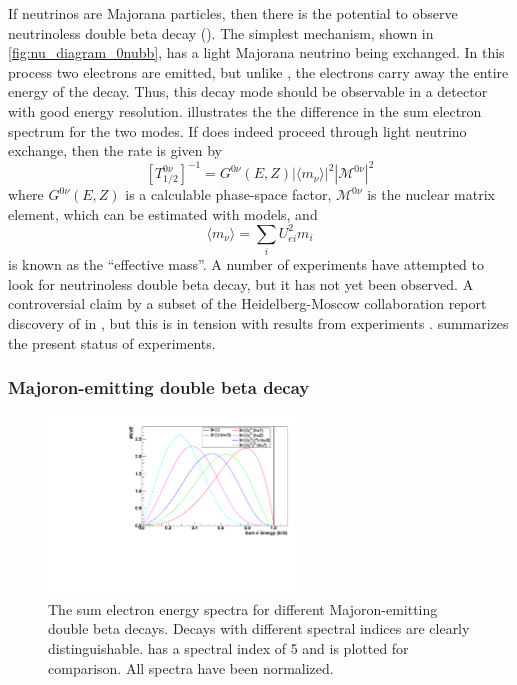 \documentclass[herrin-thesis.tex]{subfiles}
\begin{document}
If neutrinos are Majorana particles, then there is the potential to observe neutrinoless double beta decay (\zeronu{}). The simplest mechanism, shown in \cref{fig:nu_diagram_0nubb}, has a light Majorana neutrino being exchanged. In this process two electrons are emitted, but unlike \twonu{}, the electrons carry away the entire energy of the decay. Thus, this decay mode should be observable in a detector with good energy resolution.  illustrates the the difference in the sum electron spectrum for the two modes. If \zeronu{} does indeed proceed through light neutrino exchange, then the rate is given by
\begin{equation}
\left [ T^{0\nu}_{1/2} \right ]^{-1} = G^{0\nu}\left(E, Z\right)\left | \langle m_{\nu} \rangle \right |^2\left | \mathcal{M}^{0\nu}\right |^2
\label{eq:nu_zeronu_rate}
\end{equation}
where \(G^{0\nu}(E,Z)\) is a calculable phase-space factor, \( \mathcal{M}^{0\nu}\) is the nuclear matrix element, which can be estimated with models, and
\begin{equation}
\langle m_{\nu} \rangle = \sum_i U_{e i}^2 m_i
\label{eq:nu_meff_def}
\end{equation}
is known as the ``effective mass''. A number of experiments have attempted to look for neutrinoless double beta decay, but it has not yet been observed. A controversial claim by a subset of the Heidelberg-Moscow collaboration report discovery of \zeronu{} in  \cite{KlapdorKleingrothaus:2006ff}, but this is in tension with results from  experiments \cite{Auger:2012ar,Gando:2013fk}.  summarizes the present status of experiments.

\subsubsection{Majoron-emitting double beta decay}

\begin{figure}[htp]
	\centering
	\includegraphics[width=0.6\textwidth]{./plots/nu_majoron_spectra}
	\caption[Energy spectra for Majoron-emitting double beta decay modes]{The sum electron energy spectra for different Majoron-emitting double beta decays. Decays with different spectral indices are clearly distinguishable. \twonu{} has a spectral index of 5 and is plotted for comparison. All spectra have been normalized.}
	\label{fig:nu_majoron_spectra}
\end{figure}
\end{document}
